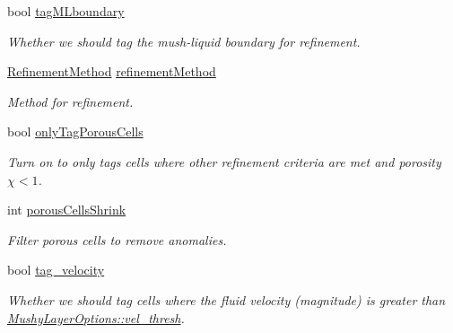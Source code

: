 \begin{DoxyCompactItemize}
bool \hyperlink{struct_mushy_layer_options_ade35a236c18464420083844e4ad8edc4}{tag\+M\+Lboundary}
\begin{DoxyCompactList}\small\item\em Whether we should tag the mush-\/liquid boundary for refinement. \end{DoxyCompactList}\item 
\mbox{\label{struct_mushy_layer_options_ac28eb449f9452444a084ccc7325cb869}} 
\hyperlink{mushy_layer_opt_8h_ad767f132740c90bc3329dc12556cd562}{Refinement\+Method} \hyperlink{struct_mushy_layer_options_ac28eb449f9452444a084ccc7325cb869}{refinement\+Method}
\begin{DoxyCompactList}\small\item\em Method for refinement. \end{DoxyCompactList}\item 
\mbox{\label{struct_mushy_layer_options_a7b77bf057a303e7c266e4f3c97cb9b44}} 
bool \hyperlink{struct_mushy_layer_options_a7b77bf057a303e7c266e4f3c97cb9b44}{only\+Tag\+Porous\+Cells}
\begin{DoxyCompactList}\small\item\em Turn on to only tags cells where other refinement criteria are met and porosity $\chi < 1 $. \end{DoxyCompactList}\item 
int \hyperlink{struct_mushy_layer_options_adf46ef76ff864b7fa57f69977e9a81d8}{porous\+Cells\+Shrink}
\begin{DoxyCompactList}\small\item\em Filter porous cells to remove anomalies. \end{DoxyCompactList}\item 
\mbox{\label{struct_mushy_layer_options_a34abc03bc7d8a50a7e3517a3df24e4db}} 
bool \hyperlink{struct_mushy_layer_options_a34abc03bc7d8a50a7e3517a3df24e4db}{tag\+\_\+velocity}
\begin{DoxyCompactList}\small\item\em Whether we should tag cells where the fluid velocity (magnitude) is greater than \hyperlink{struct_mushy_layer_options_aaa6e2f84d08048bf850d463055334710}{Mushy\+Layer\+Options\+::vel\+\_\+thresh}. \end{DoxyCompactList}\item 
\mbox{\label{struct_mushy_layer_options_ab64209e545edfc1784891b54d60aac5e}} 

\end{DoxyCompactItemize}
